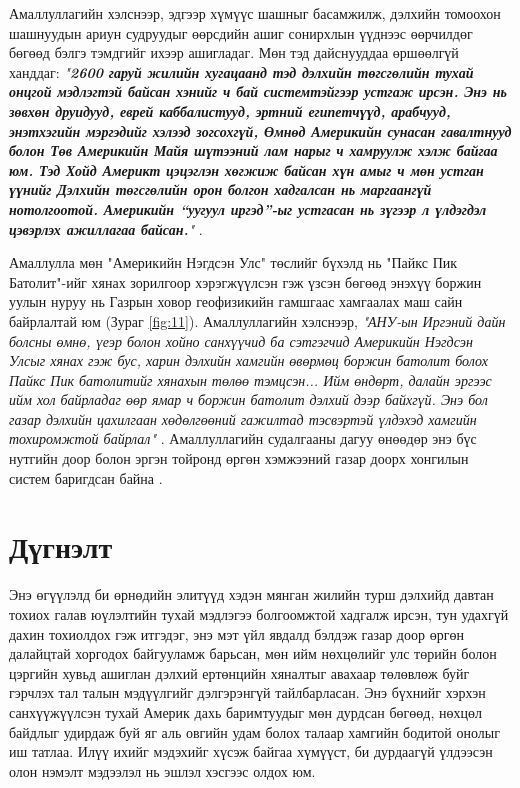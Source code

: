 \documentclass[10pt,twocolumn,letterpaper]{article}
\begin{document}
Амаллуллагийн хэлснээр, эдгээр хүмүүс шашныг басамжилж, дэлхийн томоохон шашнуудын ариун судруудыг өөрсдийн ашиг сонирхлын үүднээс өөрчилдөг бөгөөд бэлгэ тэмдгийг ихээр ашигладаг. Мөн тэд дайснууддаа өршөөлгүй ханддаг: \textit{"\textbf{2600 гаруй жилийн хугацаанд тэд дэлхийн төгсгөлийн тухай онцгой мэдлэгтэй байсан хэнийг ч бай системтэйгээр устгаж ирсэн. Энэ нь зөвхөн друидууд, еврей каббалистууд, эртний египетчүүд, арабчууд, энэтхэгийн мэргэдийг хэлээд зогсохгүй, Өмнөд Америкийн сунасан гавалтнууд болон Төв Америкийн Майя шүтээний лам нарыг ч хамруулж хэлж байгаа юм. Тэд Хойд Америкт цэцэглэн хөгжиж байсан хүн амыг ч мөн устган үүнийг Дэлхийн төгсгөлийн орон болгон хадгалсан нь маргаангүй нотолгоотой. Америкийн “уугуул иргэд”-ыг устгасан нь зүгээр л үлдэгдэл цэвэрлэх ажиллагаа байсан.}"} \cite{33,34}.

Амаллулла мөн "Америкийн Нэгдсэн Улс" төслийг бүхэлд нь "Пайкс Пик Батолит"-ийг хянах зорилгоор хэрэгжүүлсэн гэж үзсэн бөгөөд энэхүү боржин уулын нуруу нь Газрын ховор геофизикийн гамшгаас хамгаалах маш сайн байрлалтай юм (Зураг \ref{fig:11}). Амаллуллагийн хэлснээр, \textit{"АНУ-ын Иргэний дайн болсны өмнө, үеэр болон хойно санхүүчид ба сэтгэгчид Америкийн Нэгдсэн Улсыг хянах гэж бус, харин дэлхийн хамгийн өвөрмөц боржин батолит болох Пайкс Пик батолитийг хянахын төлөө тэмцсэн... Ийм өндөрт, далайн эргээс ийм хол байрладаг өөр ямар ч боржин батолит дэлхий дээр байхгүй. Энэ бол газар дэлхийн цахилгаан хөдөлгөөний гажилтад тэсвэртэй үлдэхэд хамгийн тохиромжтой байрлал"} \cite{33,34}. Амаллуллагийн судалгааны дагуу өнөөдөр энэ бүс нутгийн доор болон эргэн тойронд өргөн хэмжээний газар доорх хонгилын систем баригдсан байна \cite{36}.

\section{Дүгнэлт}

Энэ өгүүлэлд би өрнөдийн элитүүд хэдэн мянган жилийн турш дэлхийд давтан тохиох галав юүлэлтийн тухай мэдлэгээ болгоомжтой хадгалж ирсэн, тун удахгүй дахин тохиолдох гэж итгэдэг, энэ мэт үйл явдалд бэлдэж газар доор өргөн далайцтай хоргодох байгууламж барьсан, мөн ийм нөхцөлийг улс төрийн болон цэргийн хувьд ашиглан дэлхий ертөнцийн хяналтыг авахаар төлөвлөж буйг гэрчлэх тал талын мэдүүлгийг дэлгэрэнгүй тайлбарласан. Энэ бүхнийг хэрхэн санхүүжүүлсэн тухай Америк дахь баримтуудыг мөн дурдсан бөгөөд, нөхцөл байдлыг удирдаж буй яг аль овгийн удам болох талаар хамгийн бодитой онолыг иш татлаа. Илүү ихийг мэдэхийг хүсэж байгаа хүмүүст, би дурдаагүй үлдээсэн олон нэмэлт мэдээлэл нь эшлэл хэсгээс олдох юм.
\end{document}
